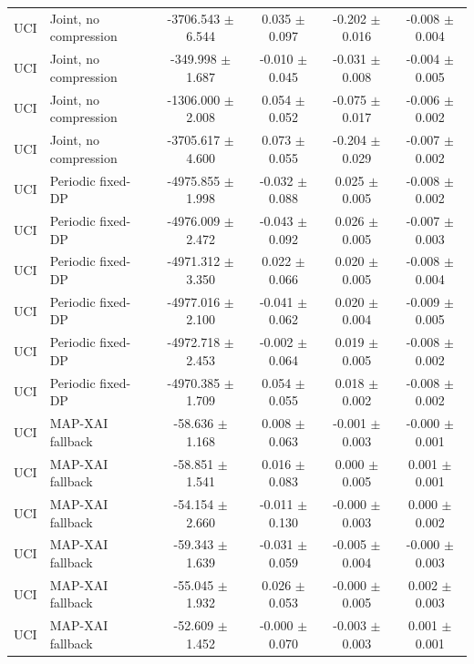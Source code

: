 \begin{table}[t]
\begin{tabular}{llcccc}
UCI & Joint, no compression & -3706.543 $\pm$ 6.544 & 0.035 $\pm$ 0.097 & -0.202 $\pm$ 0.016 & -0.008 $\pm$ 0.004 \\
UCI & Joint, no compression & -349.998 $\pm$ 1.687 & -0.010 $\pm$ 0.045 & -0.031 $\pm$ 0.008 & -0.004 $\pm$ 0.005 \\
UCI & Joint, no compression & -1306.000 $\pm$ 2.008 & 0.054 $\pm$ 0.052 & -0.075 $\pm$ 0.017 & -0.006 $\pm$ 0.002 \\
UCI & Joint, no compression & -3705.617 $\pm$ 4.600 & 0.073 $\pm$ 0.055 & -0.204 $\pm$ 0.029 & -0.007 $\pm$ 0.002 \\
UCI & Periodic fixed-DP & -4975.855 $\pm$ 1.998 & -0.032 $\pm$ 0.088 & 0.025 $\pm$ 0.005 & -0.008 $\pm$ 0.002 \\
UCI & Periodic fixed-DP & -4976.009 $\pm$ 2.472 & -0.043 $\pm$ 0.092 & 0.026 $\pm$ 0.005 & -0.007 $\pm$ 0.003 \\
UCI & Periodic fixed-DP & -4971.312 $\pm$ 3.350 & 0.022 $\pm$ 0.066 & 0.020 $\pm$ 0.005 & -0.008 $\pm$ 0.004 \\
UCI & Periodic fixed-DP & -4977.016 $\pm$ 2.100 & -0.041 $\pm$ 0.062 & 0.020 $\pm$ 0.004 & -0.009 $\pm$ 0.005 \\
UCI & Periodic fixed-DP & -4972.718 $\pm$ 2.453 & -0.002 $\pm$ 0.064 & 0.019 $\pm$ 0.005 & -0.008 $\pm$ 0.002 \\
UCI & Periodic fixed-DP & -4970.385 $\pm$ 1.709 & 0.054 $\pm$ 0.055 & 0.018 $\pm$ 0.002 & -0.008 $\pm$ 0.002 \\
UCI & MAP-XAI fallback & -58.636 $\pm$ 1.168 & 0.008 $\pm$ 0.063 & -0.001 $\pm$ 0.003 & -0.000 $\pm$ 0.001 \\
UCI & MAP-XAI fallback & -58.851 $\pm$ 1.541 & 0.016 $\pm$ 0.083 & 0.000 $\pm$ 0.005 & 0.001 $\pm$ 0.001 \\
UCI & MAP-XAI fallback & -54.154 $\pm$ 2.660 & -0.011 $\pm$ 0.130 & -0.000 $\pm$ 0.003 & 0.000 $\pm$ 0.002 \\
UCI & MAP-XAI fallback & -59.343 $\pm$ 1.639 & -0.031 $\pm$ 0.059 & -0.005 $\pm$ 0.004 & -0.000 $\pm$ 0.003 \\
UCI & MAP-XAI fallback & -55.045 $\pm$ 1.932 & 0.026 $\pm$ 0.053 & -0.000 $\pm$ 0.005 & 0.002 $\pm$ 0.003 \\
UCI & MAP-XAI fallback & -52.609 $\pm$ 1.452 & -0.000 $\pm$ 0.070 & -0.003 $\pm$ 0.003 & 0.001 $\pm$ 0.001 \\
\bottomrule
\end{tabular}
\end{table}
